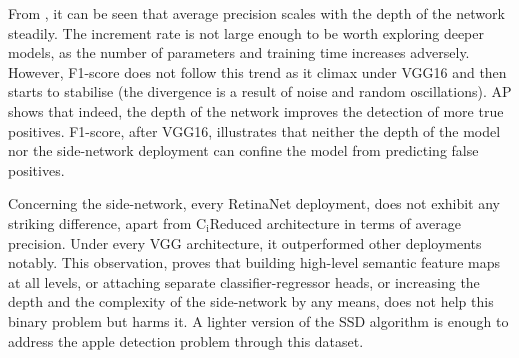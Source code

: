 From , it can be seen that average precision scales with the depth of the network steadily. The increment rate is not large enough to be worth exploring deeper models, as the number of parameters and training time increases adversely. However, F1-score does not follow this trend as it climax under VGG16 and then starts to stabilise (the divergence is a result of noise and random oscillations). AP shows that indeed, the depth of the network improves the detection of more true positives. F1-score, after VGG16, illustrates that neither the depth of the model nor the side-network deployment can confine the model from predicting false positives.

Concerning the side-network, every RetinaNet deployment, does not exhibit any striking difference, apart from $\text{C}_\text{i}\text{Reduced}$ architecture in terms of average precision. Under every VGG architecture, it outperformed other deployments notably. This observation, proves that building high-level semantic feature maps at all levels, or attaching separate classifier-regressor heads, or increasing the depth and the complexity of the side-network by any means, does not help this binary problem but harms it. A lighter version of the SSD algorithm is enough to address the apple detection problem through this dataset.


\begin{table}[!htb]
  \centering
  \caption{Analytical values of  for a more accurate comparison. Parentheses indicate the input resolution.}
  \label{tab2}
\end{table}


